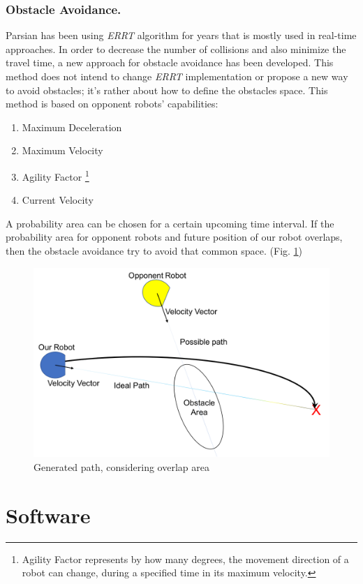 \documentclass{llncs}
\begin{document}
\subsubsection{Obstacle Avoidance.}
\label{subsubsec:ObstacleAvoidance}
Parsian has been using \textit{ERRT} algorithm for years that is mostly used in real-time approaches. In order to decrease the number of collisions and also minimize the travel time, a new approach for obstacle avoidance has been developed. This method does not intend to change \textit{ERRT} implementation or propose a new way to avoid obstacles; it’s rather about how to define the obstacles space.
This method is based on opponent robots’ capabilities:
\begin{enumerate}  
\item Maximum Deceleration
\item Maximum Velocity
\item Agility Factor
\footnote{Agility Factor represents by how many degrees, the movement direction of a robot can change, during a specified time in its maximum velocity.}
\item Current Velocity 
\end{enumerate}
A probability area can be chosen for a certain upcoming time interval.
    If the probability area for opponent robots and future position of our robot overlaps, then the obstacle avoidance try to avoid that common space. (Fig. \ref{fig:obs1})

\begin{figure}
\includegraphics[width=\textwidth]{img/obs}
\caption{Generated path, considering overlap area}
\label{fig:obs1}
\end{figure}


%
\newpage
\section{Software}
\end{document}
